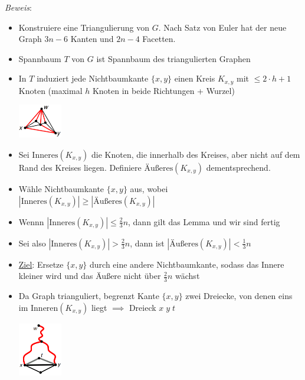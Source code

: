 \textit{Beweis}: 
\begin{itemize}
	\item Konstruiere eine Triangulierung von $G$. Nach Satz von Euler hat der neue Graph $3n-6$ Kanten und $2n-4$ Facetten.
	\item Spannbaum $T$ von $G$ ist Spannbaum des triangulierten Graphen
	\item In $T$ induziert jede Nichtbaumkante $\{x,y\}$ einen Kreis $K_{x,y}$ mit $\leq 2\cdot h+1$ Knoten (maximal $h$ Knoten in beide Richtungen + Wurzel)
	\begin{center}
		\includegraphics[width=0.15\textwidth]{images/pst-1.png}
	\end{center}
	\item Sei $\text{Inneres}(K_{x,y})$ die Knoten, die innerhalb des Kreises, aber nicht auf dem Rand des Kreises liegen. Definiere $\text{Äußeres}(K_{x,y})$ dementsprechend.
	\item Wähle Nichtbaumkante $\{x,y\}$ aus, wobei $|\text{Inneres}(K_{x,y})|\geq|\text{Äußeres}(K_{x,y})|$
	\item Wennn $|\text{Inneres}(K_{x,y})| \leq \frac{2}{3}n$, dann gilt das Lemma und wir sind fertig
	\item Sei also  $|\text{Inneres}(K_{x,y})|>\frac{2}{3}n$, dann ist $|\text{Äußeres}(K_{x,y})|<\frac{1}{3}n$
	\item \underline{Ziel}: Ersetze $\{x,y\}$ durch eine andere Nichtbaumkante, sodass das Innere kleiner wird und das Äußere nicht über $\frac{2}{3}n$ wächst
	\item Da Graph trianguliert, begrenzt Kante $\{x,y\}$ zwei Dreiecke, von denen eins im $\text{Inneren}(K_{x,y})$ liegt $\implies$ Dreieck $x\;y\;t$
	\begin{center}
		\includegraphics[width=0.15\textwidth]{images/pst-2.png}
	\end{center}
\end{itemize}

